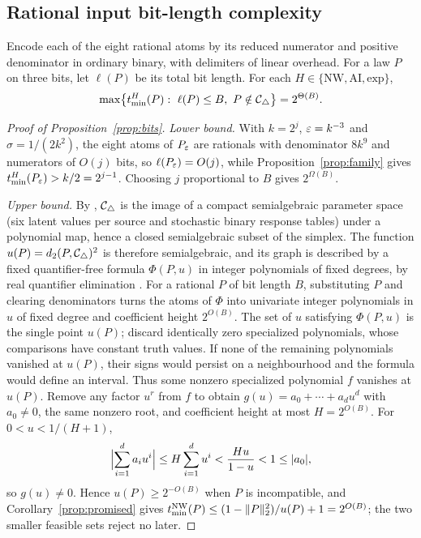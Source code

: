 \subsection{Rational input bit-length complexity}\label{sec:bits}

\begin{proposition}\label{prop:bits}
Encode each of the eight rational atoms by its reduced numerator and positive denominator in ordinary binary, with delimiters of linear overhead. For a law $P$ on three bits, let $\ell(P)$ be its total bit length. For each $H\in\{\mathrm{NW},\mathrm{AI},\mathrm{exp}\}$,
\[
\max\bigl\{\tmin^H(P):\ \ell(P)\le B,\ P\notin\Ctri\bigr\}=2^{\Theta(B)} .
\]
\end{proposition}

\begin{proof}[Proof of Proposition~\ref{prop:bits}]
\emph{Lower bound.} With $k=2^j$, $\varepsilon=k^{-3}$ and $\sigma=1/(2k^2)$, the eight atoms of $P_\varepsilon$ are rationals with denominator $8k^9$ and numerators of $O(j)$ bits, so $\ell(P_\varepsilon)=O(j)$, while Proposition~\ref{prop:family} gives $t_{\min}^H(P_\varepsilon)>k/2=2^{j-1}$. Choosing $j$ proportional to $B$ gives $2^{\Omega(B)}$.

\emph{Upper bound.} By \cite{RGW2018}, $\mathcal C_{\triangle}$ is the image of a compact semialgebraic parameter space (six latent values per source and stochastic binary response tables) under a polynomial map, hence a closed semialgebraic subset of the simplex. The function $u(P)=d_2(P,\mathcal C_{\triangle})^2$ is therefore semialgebraic, and its graph is described by a fixed quantifier-free formula $\Phi(P,u)$ in integer polynomials of fixed degrees, by real quantifier elimination \cite{BasuPollackRoy2006}. For a rational $P$ of bit length $B$, substituting $P$ and clearing denominators turns the atoms of $\Phi$ into univariate integer polynomials in $u$ of fixed degree and coefficient height $2^{O(B)}$. The set of $u$ satisfying $\Phi(P,u)$ is the single point $u(P)$; discard identically zero specialized polynomials, whose comparisons have constant truth values. If none of the remaining polynomials vanished at $u(P)$, their signs would persist on a neighbourhood and the formula would define an interval. Thus some nonzero specialized polynomial $f$ vanishes at $u(P)$. Remove any factor $u^r$ from $f$ to obtain $g(u)=a_0+\cdots+a_du^d$ with $a_0\ne0$, the same nonzero root, and coefficient height at most $H=2^{O(B)}$. For $0<u<1/(H+1)$,
\[
\Bigl|\sum_{i=1}^d a_i u^i\Bigr|\le H\sum_{i=1}^d u^i<\frac{Hu}{1-u}<1\le|a_0|,
\]
so $g(u)\ne0$. Hence $u(P)\ge2^{-O(B)}$ when $P$ is incompatible, and Corollary~\ref{prop:promised} gives $t_{\min}^{\mathrm{NW}}(P)\le(1-\|P\|_2^2)/u(P)+1=2^{O(B)}$; the two smaller feasible sets reject no later.
\end{proof}


